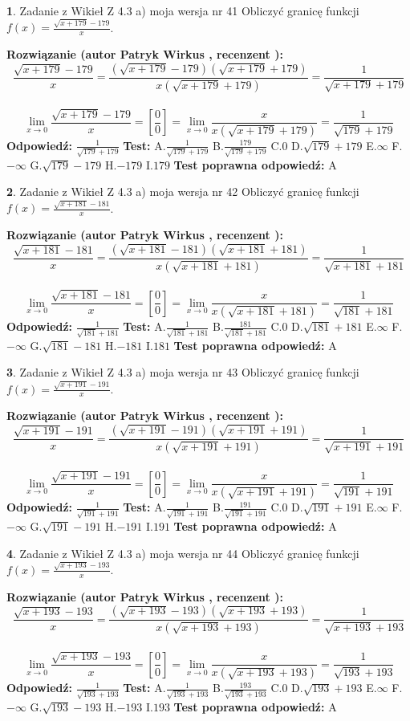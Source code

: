 \documentclass[12pt, a4paper]{article}
\theoremstyle{definition} %
\newtheorem{zad}{}
\newcommand{\zadStart}[1]{\begin{zad}#1\newline}
\newcommand{\zadStop}{\end{zad}}
\newcommand{\rozwStart}[2]{\noindent \textbf{Rozwiązanie (autor #1 , recenzent #2): }\newline}
\newcommand{\rozwStop}{\newline}
\newcommand{\odpStart}{\noindent \textbf{Odpowiedź:}\newline}
\newcommand{\odpStop}{\newline}
\newcommand{\testStart}{\noindent \textbf{Test:}\newline}
\newcommand{\testStop}{\newline}
\newcommand{\kluczStart}{\noindent \textbf{Test poprawna odpowiedź:}\newline}
\newcommand{\kluczStop}{\newline}
\begin{document}
\zadStart{Zadanie z Wikieł Z 4.3 a) moja wersja nr 41}
Obliczyć granicę funkcji $f(x)=\frac{\sqrt{x+179}-179}{x}$.
\zadStop
\rozwStart{Patryk Wirkus}{}
$$\frac{\sqrt{x+179}-179}{x}=\frac{(\sqrt{x+179}-179)(\sqrt{x+179}+179)}{x(\sqrt{x+179}+179)}=\frac{1}{\sqrt{x+179}+179}$$
\\
$$\lim\limits_{x\to0}\frac{\sqrt{x+179}-179}{x}=[\frac{0}{0}]=
\lim\limits_{x\to0}\frac{x}{x(\sqrt{x+179}+179)} = \frac{1}{\sqrt{179}+179}$$
\rozwStop
\odpStart
$\frac{1}{\sqrt{179}+179}$
\odpStop
\testStart
A.$\frac{1}{\sqrt{179}+179}$
B.$\frac{179}{\sqrt{179}+179}$
C.$0$
D.$\sqrt{179}+179$
E.$\infty$
F.$-\infty$
G.$\sqrt{179}-179$
H.$-179$
I.$179$
\testStop
\kluczStart
A
\kluczStop



\zadStart{Zadanie z Wikieł Z 4.3 a) moja wersja nr 42}
Obliczyć granicę funkcji $f(x)=\frac{\sqrt{x+181}-181}{x}$.
\zadStop
\rozwStart{Patryk Wirkus}{}
$$\frac{\sqrt{x+181}-181}{x}=\frac{(\sqrt{x+181}-181)(\sqrt{x+181}+181)}{x(\sqrt{x+181}+181)}=\frac{1}{\sqrt{x+181}+181}$$
\\
$$\lim\limits_{x\to0}\frac{\sqrt{x+181}-181}{x}=[\frac{0}{0}]=
\lim\limits_{x\to0}\frac{x}{x(\sqrt{x+181}+181)} = \frac{1}{\sqrt{181}+181}$$
\rozwStop
\odpStart
$\frac{1}{\sqrt{181}+181}$
\odpStop
\testStart
A.$\frac{1}{\sqrt{181}+181}$
B.$\frac{181}{\sqrt{181}+181}$
C.$0$
D.$\sqrt{181}+181$
E.$\infty$
F.$-\infty$
G.$\sqrt{181}-181$
H.$-181$
I.$181$
\testStop
\kluczStart
A
\kluczStop



\zadStart{Zadanie z Wikieł Z 4.3 a) moja wersja nr 43}
Obliczyć granicę funkcji $f(x)=\frac{\sqrt{x+191}-191}{x}$.
\zadStop
\rozwStart{Patryk Wirkus}{}
$$\frac{\sqrt{x+191}-191}{x}=\frac{(\sqrt{x+191}-191)(\sqrt{x+191}+191)}{x(\sqrt{x+191}+191)}=\frac{1}{\sqrt{x+191}+191}$$
\\
$$\lim\limits_{x\to0}\frac{\sqrt{x+191}-191}{x}=[\frac{0}{0}]=
\lim\limits_{x\to0}\frac{x}{x(\sqrt{x+191}+191)} = \frac{1}{\sqrt{191}+191}$$
\rozwStop
\odpStart
$\frac{1}{\sqrt{191}+191}$
\odpStop
\testStart
A.$\frac{1}{\sqrt{191}+191}$
B.$\frac{191}{\sqrt{191}+191}$
C.$0$
D.$\sqrt{191}+191$
E.$\infty$
F.$-\infty$
G.$\sqrt{191}-191$
H.$-191$
I.$191$
\testStop
\kluczStart
A
\kluczStop



\zadStart{Zadanie z Wikieł Z 4.3 a) moja wersja nr 44}
Obliczyć granicę funkcji $f(x)=\frac{\sqrt{x+193}-193}{x}$.
\zadStop
\rozwStart{Patryk Wirkus}{}
$$\frac{\sqrt{x+193}-193}{x}=\frac{(\sqrt{x+193}-193)(\sqrt{x+193}+193)}{x(\sqrt{x+193}+193)}=\frac{1}{\sqrt{x+193}+193}$$
\\
$$\lim\limits_{x\to0}\frac{\sqrt{x+193}-193}{x}=[\frac{0}{0}]=
\lim\limits_{x\to0}\frac{x}{x(\sqrt{x+193}+193)} = \frac{1}{\sqrt{193}+193}$$
\rozwStop
\odpStart
$\frac{1}{\sqrt{193}+193}$
\odpStop
\testStart
A.$\frac{1}{\sqrt{193}+193}$
B.$\frac{193}{\sqrt{193}+193}$
C.$0$
D.$\sqrt{193}+193$
E.$\infty$
F.$-\infty$
G.$\sqrt{193}-193$
H.$-193$
I.$193$
\testStop
\kluczStart
A
\kluczStop
\end{document}
